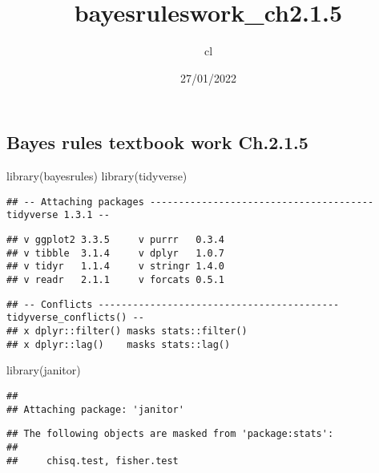 \documentclass[
]{article}
\title{bayesruleswork\_ch2.1.5}
\author{cl}
\date{27/01/2022}
\newenvironment{Shaded}{\begin{snugshade}}{\end{snugshade}}
\newcommand{\FunctionTok}[1]{\textcolor[rgb]{0.00,0.00,0.00}{#1}}
\newcommand{\NormalTok}[1]{#1}
\begin{document}
\maketitle

\hypertarget{bayes-rules-textbook-work-ch.2.1.5}{%
\subsection{Bayes rules textbook work
Ch.2.1.5}\label{bayes-rules-textbook-work-ch.2.1.5}}

\begin{Shaded}
\begin{Highlighting}[]
\FunctionTok{library}\NormalTok{(bayesrules)}
\FunctionTok{library}\NormalTok{(tidyverse)}
\end{Highlighting}
\end{Shaded}

\begin{verbatim}
## -- Attaching packages --------------------------------------- tidyverse 1.3.1 --
\end{verbatim}

\begin{verbatim}
## v ggplot2 3.3.5     v purrr   0.3.4
## v tibble  3.1.4     v dplyr   1.0.7
## v tidyr   1.1.4     v stringr 1.4.0
## v readr   2.1.1     v forcats 0.5.1
\end{verbatim}

\begin{verbatim}
## -- Conflicts ------------------------------------------ tidyverse_conflicts() --
## x dplyr::filter() masks stats::filter()
## x dplyr::lag()    masks stats::lag()
\end{verbatim}

\begin{Shaded}
\begin{Highlighting}[]
\FunctionTok{library}\NormalTok{(janitor)}
\end{Highlighting}
\end{Shaded}

\begin{verbatim}
## 
## Attaching package: 'janitor'
\end{verbatim}

\begin{verbatim}
## The following objects are masked from 'package:stats':
## 
##     chisq.test, fisher.test
\end{verbatim}
\end{document}
